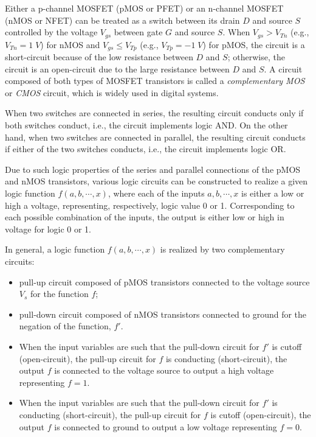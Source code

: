 \begin{itemize}
Either a p-channel MOSFET (pMOS or PFET) or an n-channel MOSFET (nMOS or NFET)
can be treated as a switch between its drain $D$ and source $S$ controlled by
the voltage $V_{gs}$ between gate $G$ and source $S$. When $V_{gs}>V_{Tn}$ 
(e.g.,  $V_{Tn}=1\;V$) for nMOS and $V_{gs}\le V_{Tp}$ (e.g.,  $V_{Tp}=-1\;V$)
for pMOS, the circuit is a short-circuit because of the low resistance between 
$D$ and $S$; otherwise, the circuit is an open-circuit due to the large 
resistance between $D$ and $S$. A circuit composed of both types of MOSFET 
transistors is called a {\em complementary MOS} or {\em CMOS} circuit, which
is widely used in digital systems.

When two switches are connected in series, the resulting circuit conducts 
only if both switches conduct, i.e., the circuit implements logic AND. On 
the other hand, when two switches are connected in parallel, the resulting 
circuit conducts if either of the two switches conducts, i.e., the circuit 
implements logic OR.

Due to such logic properties of the series and parallel connections of the
pMOS and nMOS transistors, various logic circuits can be constructed to 
realize a given logic function $f(a,b,\cdots,x)$, where each of the inputs
$a,b,\cdots,x$ is either a low or high a voltage, representing, respectively,
logic value 0 or 1. Corresponding to each possible combination of the inputs,
the output is either low or high in voltage for logic 0 or 1.

In general, a logic function $f(a,b,\cdots,x)$ is realized by two 
complementary circuits:
\begin{itemize}
\item pull-up circuit composed of pMOS transistors connected to the voltage 
  source $V_s$ for the function $f$;
\item pull-down circuit composed of nMOS transistors connected to ground 
  for the negation of the function, $f'$.
\end{itemize}


\begin{itemize}
\item When the input variables are such that the pull-down circuit for
  $f'$ is cutoff (open-circuit), the pull-up circuit for $f$ is conducting
  (short-circuit), the output $f$ is connected to the voltage source to 
  output a high voltage representing $f=1$.

\item When the input variables are such that the pull-down circuit for 
  $f'$ is conducting (short-circuit), the pull-up circuit for $f$ is cutoff
  (open-circuit), the output $f$ is connected to ground to output a low 
  voltage representing $f=0$.
\end{itemize}


\end{itemize}
